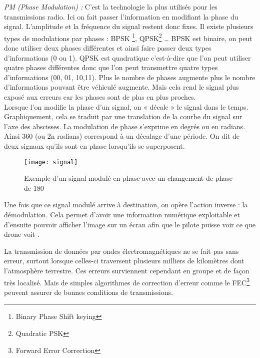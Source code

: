  

\textit{PM (Phase Modulation) :} C’est la technologie la plus utilisés pour les transmissions radio. Ici on fait passer l’information en modifiant la phase du signal. L’amplitude et la fréquence du signal restent donc fixes. Il existe plusieurs types de modulations par phases : BPSK \footnote{Binary Phase Shift keying}, QPSK\footnote{Quadratic PSK} … BPSK est binaire, on peut donc utiliser deux phases différentes et ainsi faire passer deux types d’informations (0 ou 1). QPSK est quadratique c'est-à-dire que l’on peut utiliser quatre phases différentes donc que l’on peut transmettre quatre types d’informations (00, 01, 10,11). Plus le nombre de phases augmente plus le nombre d’informations pouvant être véhiculé augmente. Mais cela rend le signal plus  exposé aux erreurs car les phases sont de plus en plus proches. ~\\

 

Lorsque l’on modifie la phase d’un signal, on « décale » le signal dans le temps. Graphiquement, cela se traduit par une translation de la courbe du signal sur l’axe des abscisses. La modulation de phase s’exprime en degrés ou en radians. Ainsi 360 (ou 2n radians) correspond à un décalage d’une période. On dit de deux signaux qu’ils sont en phase lorsqu’ils se superposent. 

 

\begin{figure}[h]
  \centering
  \texttt{[image: signal]}
  \caption{Exemple d'un signal modulé en phase avec un changement de phase de 180}
\end{figure}

 

 

Une fois que ce signal modulé arrive à destination, on opère l’action inverse : la démodulation. Cela permet d’avoir une information numérique exploitable et d’ensuite pouvoir afficher l’image sur un écran afin que le pilote puisse voir ce que drone \og voit \fg{}. 

 

La transmission de données par ondes électromagnétiques ne se fait pas sans erreur, surtout lorsque celles-ci traversent plusieurs milliers de kilomètres dont l'atmosphère terrestre. Ces erreurs surviennent cependant en groupe et de façon très localisé. Mais de simples algorithmes de correction d’erreur comme le FEC\footnote{Forward Error Correction} peuvent assurer de bonnes conditions de transmissions. 

